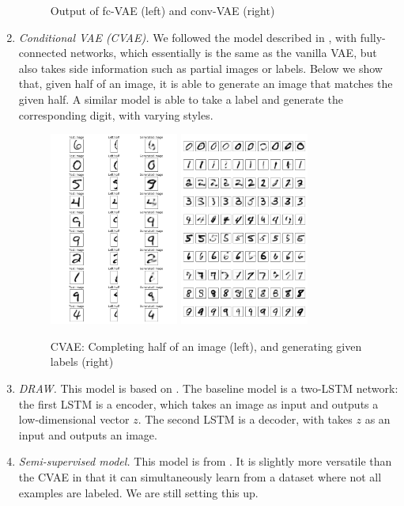\documentclass[11pt]{article}
\begin{document}
\begin{enumerate}
\begin{figure}[!ht]
        \caption{Output of fc-VAE (left) and conv-VAE (right)}
    \end{figure}
    \item \emph{Conditional VAE (CVAE).} We followed the model described in \cite{doersch2016tutorial}, with fully-connected networks, which essentially is the same as the vanilla VAE, but also takes side information such as partial images or labels. Below we show that, given half of an image, it is able to generate an image that matches the given half. A similar model is able to take a label and generate the corresponding digit, with varying styles.
    \begin{figure}[!ht]
    \centering
    \includegraphics[width=0.4\textwidth]{img/left_half.png}\quad
    \includegraphics[width=0.4\textwidth]{img/by_label.png}
    \caption{CVAE: Completing half of an image (left), and generating given labels (right)}
    \end{figure}
    \item \emph{DRAW.} This model is based on \cite{gregor2015draw}. The baseline model is a two-LSTM network: the first LSTM is a encoder, which takes an image as input and outputs a low-dimensional vector $z$. The second LSTM is a decoder, with takes $z$ as an input and outputs an image.
    \item \emph{Semi-supervised model.} This model is from \cite{DBLP:journals/corr/KingmaRMW14}. It is slightly more versatile than the CVAE in that it can simultaneously learn from a dataset where not all examples are labeled. We are still setting this up.


\end{enumerate}
\end{document}
